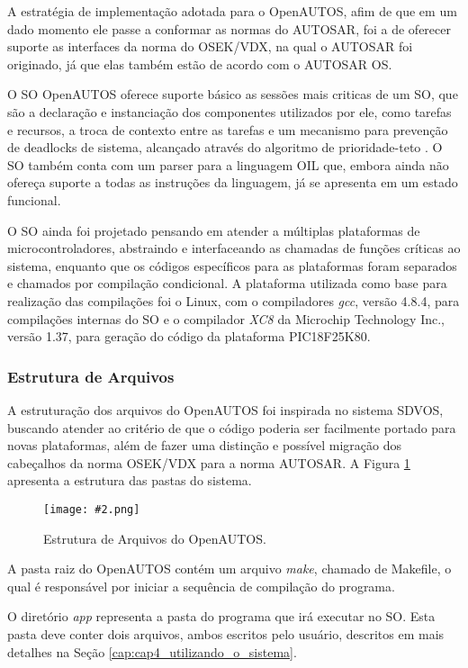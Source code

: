 \documentclass[conference,compsoc]{IEEEtran}
\newcommand{\reffig}[1]{Figura \ref{fig:#1}}
\newcommand{\reftop}[1]{Seção \ref{cap:#1}}
\newcommand{\figura}[5][Extraido de:]{
	\begin{figure}[h!tb]
		\centering
		\caption{#3.}
		\texttt{[image: \#2.png]}
		\ifthenelse{\isempty{#5}}{}{%
			\\ #1 \cite{#5}.
		}	
		\label{fig:#2}
	\end{figure}
}
\begin{document}
A estratégia de implementação adotada para o OpenAUTOS, afim de que em um dado momento ele passe a conformar as normas do AUTOSAR, foi a de oferecer suporte as interfaces da norma do OSEK/VDX, na qual o AUTOSAR foi originado, já que elas também estão de acordo com o AUTOSAR OS.

O SO OpenAUTOS oferece suporte básico as sessões mais criticas de um SO, que são a declaração e instanciação dos componentes utilizados por ele, como tarefas e recursos, a troca de contexto entre as tarefas e um mecanismo para prevenção de deadlocks de sistema, alcançado através do algoritmo de prioridade-teto \cite{osc9}. O SO também conta com um parser para a linguagem OIL que, embora ainda não ofereça suporte a todas as instruções da linguagem, já se apresenta em um estado funcional.

O SO ainda foi projetado pensando em atender a múltiplas plataformas de microcontroladores, abstraindo e interfaceando as chamadas de funções críticas ao sistema, enquanto que os códigos específicos para as plataformas foram separados e chamados por compilação condicional. A plataforma utilizada como base para realização das compilações foi o Linux, com o compiladores \emph{gcc}, versão 4.8.4, para compilações internas do SO e o compilador \emph{XC8} da Microchip Technology Inc., versão 1.37, para geração do código da plataforma PIC18F25K80.

\subsubsection{Estrutura de Arquivos} \label{cap:cap4_estrutura}

A estruturação dos arquivos do OpenAUTOS foi inspirada no sistema SDVOS, buscando atender ao critério de que o código poderia ser facilmente portado para novas plataformas, além de fazer uma distinção e possível migração dos cabeçalhos da norma OSEK/VDX para a norma AUTOSAR. A \reffig{cap4_file_structure} apresenta a estrutura das pastas do sistema.

\figura{cap4_file_structure}{Estrutura de Arquivos do OpenAUTOS}{4cm}{}

A pasta raiz do OpenAUTOS contém um arquivo \emph{make}, chamado de Makefile, o qual é responsável por iniciar a sequência de compilação do programa.

O diretório \emph{app} representa a pasta do programa que irá executar no SO. Esta pasta deve conter dois arquivos, ambos escritos pelo usuário, descritos em mais detalhes na \reftop{cap4_utilizando_o_sistema}.
\end{document}
